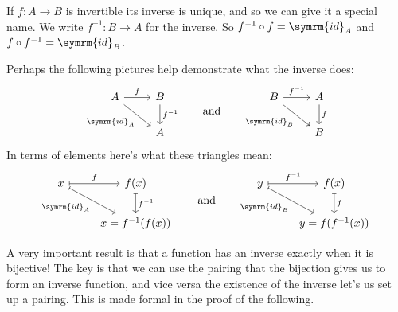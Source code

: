 \documentclass[fleqn]{LectureClass/LectureClass}
\newcommand{\id}{\symrm{id}}
\begin{document}
    \begin{ntn}{}{}
        If \(f \colon A \to B\) is invertible its inverse is unique, and so we can give it a special name.
        We write \(f^{-1} \colon B \to A\) for the inverse.
        So \(f^{-1} \circ f = \id_A\) and \(f \circ f^{-1} = \id_B\).
    \end{ntn}
    
    Perhaps the following pictures help demonstrate what the inverse does:
    \begin{equation}
        \begin{tikzcd}
            A \arrow[r, "f"] \arrow[dr, "\id_A"'] & B \arrow[d, "f^{-1}"]\\
            & A
        \end{tikzcd}
        \qqand
        \begin{tikzcd}
            B \arrow[r, "f^{-1}"] \arrow[dr, "\id_B"'] & A \arrow[d, "f"]\\
            & B
        \end{tikzcd}
    \end{equation}
    In terms of elements here's what these triangles mean:
    \begin{equation}
        \begin{tikzcd}
            x \arrow[r, mapsto, "f"] \arrow[dr, mapsto, "\id_A"'] & f(x) \arrow[d, mapsto, "f^{-1}"]\\
            & x = f^{-1}(f(x))
        \end{tikzcd}
        \qqand
        \begin{tikzcd}
            y \arrow[r, mapsto, "f^{-1}"] \arrow[dr, mapsto, "\id_B"'] & f(x) \arrow[d, mapsto, "f"]\\
            & y = f(f^{-1}(x))
        \end{tikzcd}
    \end{equation}
    
    A very important result is that a function has an inverse exactly when it is bijective!
    The key is that we can use the pairing that the bijection gives us to form an inverse function, and vice versa the existence of the inverse let's us set up a pairing.
    This is made formal in the proof of the following.
    
\end{document}
